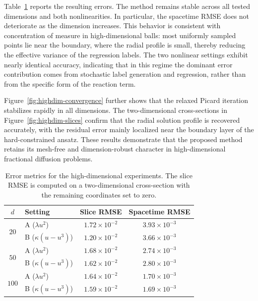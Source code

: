 \documentclass[a4paper,fleqn]{cas-sc}
\begin{document}
Table~\ref{tab:highdim-results} reports the resulting errors. The method
remains stable across all tested dimensions and both nonlinearities. In
particular, the spacetime RMSE does not deteriorate as the dimension
increases. This behavior is consistent with concentration of measure in
high-dimensional balls: most uniformly sampled points lie near the boundary,
where the radial profile is small, thereby reducing the effective variance of
the regression labels. The two nonlinear settings exhibit nearly identical
accuracy, indicating that in this regime the dominant error contribution comes
from stochastic label generation and regression, rather than from the specific
form of the reaction term.

Figure~\ref{fig:highdim-convergence} further shows that the relaxed Picard
iteration stabilizes rapidly in all dimensions. The two-dimensional
cross-sections in Figure~\ref{fig:highdim-slices} confirm that the radial
solution profile is recovered accurately, with the residual error mainly
localized near the boundary layer of the hard-constrained ansatz. These
results demonstrate that the proposed method retains its mesh-free and
dimension-robust character in high-dimensional fractional diffusion problems.

\begin{table}[pos=htbp]
\centering
\caption{Error metrics for the high-dimensional experiments. The slice RMSE is computed on a two-dimensional cross-section with the remaining coordinates set to zero.}
\label{tab:highdim-results}
\begin{tabular}{clcc}
\toprule
$d$ & Setting & Slice RMSE & Spacetime RMSE \\
\midrule
\multirow{2}{*}{$20$}
 & A ($\lambda u^2$) & $1.72\times 10^{-2}$ & $3.93\times 10^{-3}$ \\
 & B ($\kappa(u{-}u^3)$) & $1.20\times 10^{-2}$ & $3.66\times 10^{-3}$ \\
\midrule
\multirow{2}{*}{$50$}
 & A ($\lambda u^2$) & $1.68\times 10^{-2}$ & $2.74\times 10^{-3}$ \\
 & B ($\kappa(u{-}u^3)$) & $1.62\times 10^{-2}$ & $2.80\times 10^{-3}$ \\
\midrule
\multirow{2}{*}{$100$}
 & A ($\lambda u^2$) & $1.64\times 10^{-2}$ & $1.70\times 10^{-3}$ \\
 & B ($\kappa(u{-}u^3)$) & $1.59\times 10^{-2}$ & $1.69\times 10^{-3}$ \\
\bottomrule
\end{tabular}
\end{table}
\end{document}
